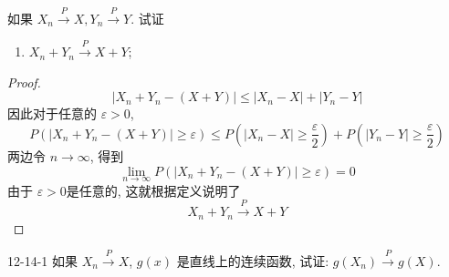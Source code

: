 \documentclass[../main.tex]{subfiles}
\begin{document}
\begin{exercise}{}{}
如果 $X_n \xrightarrow{P} X, Y_n \xrightarrow{P} Y$. 试证
\begin{enumerate}
\item $X_n + Y_n \xrightarrow{P} X + Y$;
\end{enumerate}
\end{exercise}

\begin{proof}
      \[
      \left| X_{n}+ Y_{n}-\left( X+ Y \right)  \right|\le \left| X_{n}-X \right|+ \left| Y_{n}-Y \right|   
      \]因此对于任意的 \(   \varepsilon > 0  \), \[
      P\left( \left| X_{n}+ Y_{n}-\left( X+ Y \right)  \right|\ge  \varepsilon   \right)\le P\left( \left| X_{n}-X \right|\ge  \frac{ \varepsilon  }{2 }   \right)+ P\left( \left| Y_{n}-Y \right|\ge \frac{ \varepsilon  }{2 }   \right)   
      \] 两边令 \(  n\to \infty  \), 得到  \[
    \lim_{n\to \infty} P\left( \left| X_{n}+ Y_{n}-\left( X+ Y \right)  \right|\ge  \varepsilon   \right)= 0 
      \]由于 \(   \varepsilon > 0  \)是任意的, 这就根据定义说明了 \[
     X_n + Y_n \xrightarrow{P} X + Y
      \] 
\end{proof}
\begin{exercise}{}{12-14-1}
如果 $X_n \xrightarrow{P} X$, $g(x)$ 是直线上的连续函数, 试证: $g(X_n) \xrightarrow{P} g(X)$.
\end{exercise}
\end{document}
